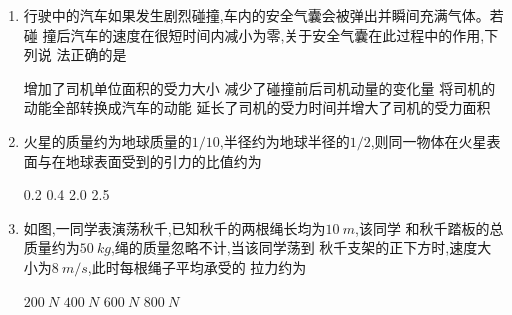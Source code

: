 




\gaokaoxz




\begin{enumerate}
\item
行驶中的汽车如果发生剧烈碰撞,车内的安全气囊会被弹出并瞬间充满气体。若碰
撞后汽车的速度在很短时间内减小为零,关于安全气囊在此过程中的作用,下列说
法正确的是  


\fourchoices
{增加了司机单位面积的受力大小}
{减少了碰撞前后司机动量的变化量}
{将司机的动能全部转换成汽车的动能}
{延长了司机的受力时间并增大了司机的受力面积}





\item 
火星的质量约为地球质量的$ 1/10 $,半径约为地球半径的$ 1/2 $,则同一物体在火星表
面与在地球表面受到的引力的比值约为  

\fourchoices
{0.2}
{0.4}
{2.0}
{2.5}


\item 
如图,一同学表演荡秋千,已知秋千的两根绳长均为$ 10 \ m $,该同学
和秋千踏板的总质量约为$ 50 \ kg $,绳的质量忽略不计,当该同学荡到
秋千支架的正下方时,速度大小为$ 8 \ m/s $,此时每根绳子平均承受的
拉力约为  
\begin{figure}[h!]
\centering
  
\end{figure}



\fourchoices
{$ 200 \ N $}
{$ 400 \ N $}
{$ 600 \ N $}
{$ 800 \ N $}




\end{enumerate}

